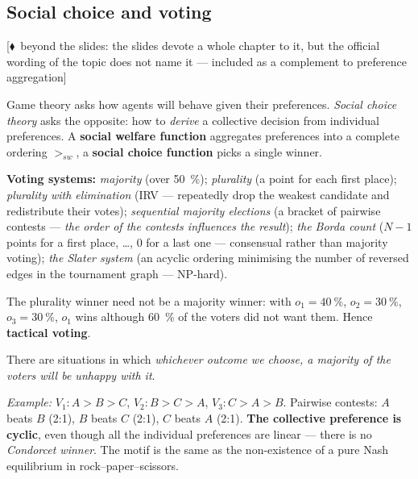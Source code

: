 \documentclass[11pt,a4paper]{article}
\theoremstyle{definition}
\newcommand{\mimoq}[1]{\textcolor{markcol}{\textsf{\footnotesize[$\blacklozenge$~beyond the slides: #1]}}}
\begin{document}
\subsection{Social choice and voting}
\label{ssec:volby}

\noindent\mimoq{the slides devote a whole chapter to it, but the official wording of the topic
does not name it --- included as a complement to preference aggregation}

Game theory asks how agents will behave given their preferences. \emph{Social choice theory}
asks the opposite: how to \emph{derive} a collective decision from individual preferences.
A \textbf{social welfare function} aggregates preferences into a complete ordering $>_{sw}$,
a \textbf{social choice function} picks a single winner.

\textbf{Voting systems:} \emph{majority} (over 50~\%); \emph{plurality} (a point for each first
place); \emph{plurality with elimination} (IRV --- repeatedly drop the weakest candidate and
redistribute their votes); \emph{sequential majority elections} (a bracket of pairwise contests
--- \emph{the order of the contests influences the result}); \emph{the Borda count}
($N-1$ points for a first place, \dots, $0$ for a last one --- consensual rather than majority
voting); \emph{the Slater system} (an acyclic ordering minimising the number of reversed edges
in the tournament graph --- NP-hard).

The plurality winner need not be a majority winner: with $o_1 = 40~\%$, $o_2 = 30~\%$,
$o_3 = 30~\%$, $o_1$ wins although 60~\% of the voters did not want them. Hence
\textbf{tactical voting}.

\begin{defbox}
There are situations in which \emph{whichever outcome we choose, a majority of the voters will
be unhappy with it}.

\emph{Example:} $V_1: A > B > C$, \quad $V_2: B > C > A$, \quad $V_3: C > A > B$.
Pairwise contests: $A$ beats $B$ (2:1), $B$ beats $C$ (2:1), $C$ beats $A$ (2:1).
\textbf{The collective preference is cyclic}, even though all the individual preferences are
linear --- there is no \emph{Condorcet winner}. The motif is the same as the non-existence of a
pure Nash equilibrium in rock--paper--scissors.
\end{defbox}
\end{document}
